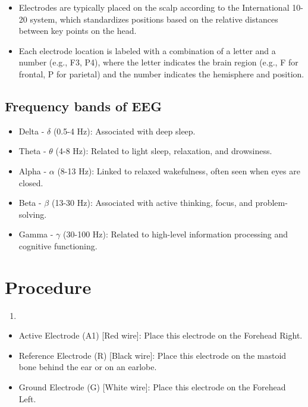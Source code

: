 \documentclass[
  11pt,
  letterpaper,
  DIV=11,
  numbers=noendperiod]{scrreprt}
\providecommand{\tightlist}{%
  \setlength{\itemsep}{0pt}\setlength{\parskip}{0pt}}\usepackage{longtable,booktabs,array}
\begin{document}
\begin{itemize}
\tightlist
\item
  Electrodes are typically placed on the scalp according to the
  International 10-20 system, which standardizes positions based on the
  relative distances between key points on the head.
\item
  Each electrode location is labeled with a combination of a letter and
  a number (e.g., F3, P4), where the letter indicates the brain region
  (e.g., F for frontal, P for parietal) and the number indicates the
  hemisphere and position.
\end{itemize}

\subsection{Frequency bands of EEG}\label{frequency-bands-of-eeg}

\begin{itemize}
\tightlist
\item
  Delta - \(\delta\) (0.5-4 Hz): Associated with deep sleep.
\item
  Theta - \(\theta\) (4-8 Hz): Related to light sleep, relaxation, and
  drowsiness.
\item
  Alpha - \(\alpha\) (8-13 Hz): Linked to relaxed wakefulness, often
  seen when eyes are closed.
\item
  Beta - \(\beta\) (13-30 Hz): Associated with active thinking, focus,
  and problem-solving.
\item
  Gamma - \(\gamma\) (30-100 Hz): Related to high-level information
  processing and cognitive functioning.
\end{itemize}

\section{Procedure}\label{procedure-4}

\begin{enumerate}
\def\labelenumi{\arabic{enumi}.}
\tightlist
\item
\end{enumerate}

\begin{itemize}
\tightlist
\item
  Active Electrode (A1) {[}Red wire{]}: Place this electrode on the
  Forehead Right.
\item
  Reference Electrode (R) {[}Black wire{]}: Place this electrode on the
  mastoid bone behind the ear or on an earlobe.
\item
  Ground Electrode (G) {[}White wire{]}: Place this electrode on the
  Forehead Left.
\end{itemize}
\end{document}
